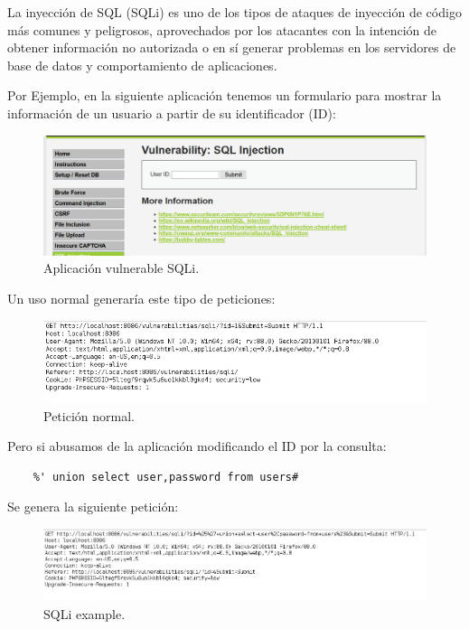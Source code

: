 La inyección de SQL (SQLi) es uno de los tipos de ataques de inyección de código más
comunes y peligrosos, aprovechados por los atacantes con la intención de obtener
información no autorizada o en sí generar problemas en los servidores de base de datos y
comportamiento de aplicaciones.

Por Ejemplo, en la siguiente aplicación tenemos un formulario para mostrar 
la información de un usuario a partir de su identificador (ID):

\begin{figure}[!htb]  
    \includegraphics[width=\linewidth]{./imagenes/013_SQLi_Example_1.png}
    \caption{Aplicación vulnerable SQLi.}  
\end{figure}

Un uso normal generaría este tipo de peticiones:

\begin{figure}[!htb]  
    \centering
    \captionsetup{width=1\linewidth}
    \includegraphics[width=\linewidth]{./imagenes/013_SQLi_Example_2.png}
    \caption{Petición normal.}  
\end{figure}

\newpage
Pero si abusamos de la aplicación modificando el ID por la consulta:\\
\begin{verbatim}
    %' union select user,password from users# 
\end{verbatim}

Se genera la siguiente petición:\\
\begin{figure}[!htb]
    \centering
    \captionsetup{width=1\linewidth}  
    \includegraphics[width=\linewidth]{./imagenes/013_SQLi_Example_3.png}
    \caption{SQLi example.}  
    \label{fig:4 - SQLi 3}
\end{figure}

